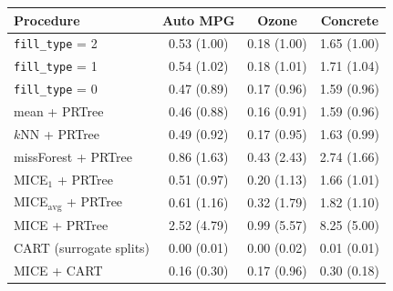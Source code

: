 \begin{tabular}{lccc}
\toprule
Procedure & Auto MPG & Ozone & Concrete\\
\midrule
\texttt{fill\_type} = 2 & 0.53 (1.00) & 0.18 (1.00) & 1.65 (1.00)\\
\texttt{fill\_type} = 1 & 0.54 (1.02) & 0.18 (1.01) & 1.71 (1.04)\\
\texttt{fill\_type} = 0 & 0.47 (0.89) & 0.17 (0.96) & 1.59 (0.96)\\
mean + PRTree & 0.46 (0.88) & 0.16 (0.91) & 1.59 (0.96)\\
$k$NN + PRTree & 0.49 (0.92) & 0.17 (0.95) & 1.63 (0.99)\\
missForest + PRTree & 0.86 (1.63) & 0.43 (2.43) & 2.74 (1.66)\\
MICE$_1$ + PRTree & 0.51 (0.97) & 0.20 (1.13) & 1.66 (1.01)\\
MICE$_{\mathrm{avg}}$ + PRTree & 0.61 (1.16) & 0.32 (1.79) & 1.82 (1.10)\\
MICE + PRTree & 2.52 (4.79) & 0.99 (5.57) & 8.25 (5.00)\\
CART (surrogate splits) & 0.00 (0.01) & 0.00 (0.02) & 0.01 (0.01)\\
MICE + CART & 0.16 (0.30) & 0.17 (0.96) & 0.30 (0.18)\\
\bottomrule
\end{tabular}
